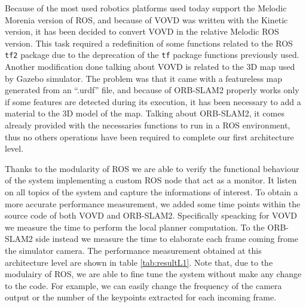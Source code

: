 Because of the most used robotics platforms used today support the Melodic Morenia \cite{rosmelodic} version of ROS, and because of VOVD was written with the Kinetic version, it has been decided to convert VOVD in the relative Melodic ROS version. This task required a redefinition of some functions related to the ROS \texttt{tf2} package \cite{tfros} due to the deprecation of the \texttt{tf} package functions previously used. 
Another modification done talking about VOVD is related to the 3D map used by Gazebo \cite{Gazebo} simulator. The problem was that it came with a featureless map generated from an ``.urdf'' file, and because of ORB-SLAM2 properly works only if some features are detected during its execution, it has been necessary to add a material to the 3D model of the map.
Talking about ORB-SLAM2, it comes already provided with the necessaries functions to run in a ROS environment, thus no others operations have been required to complete our first architecture level.

Thanks to the modularity of ROS we are able to verify the functional behaviour of the system implementing  a custom ROS node that act as a monitor. It listen on all topics of the system and capture the informations of interest.  
To obtain a more accurate performance measurement, we added some time points within the source code of both VOVD and ORB-SLAM2. Specifically speacking for VOVD we measure the time to perform the local planner computation. To the ORB-SLAM2 side instead we measure the time to elaborate each frame coming frome the simulator camera.
The performance measurement obtained at this architecture level are shown in table \ref{tab:resultL1}.
Note that, due to the modulairy of ROS, we are able to fine tune the system without make any change to the code. For example, we can easily change the frequency of the camera output or the number of the keypoints extracted for each incoming frame.


